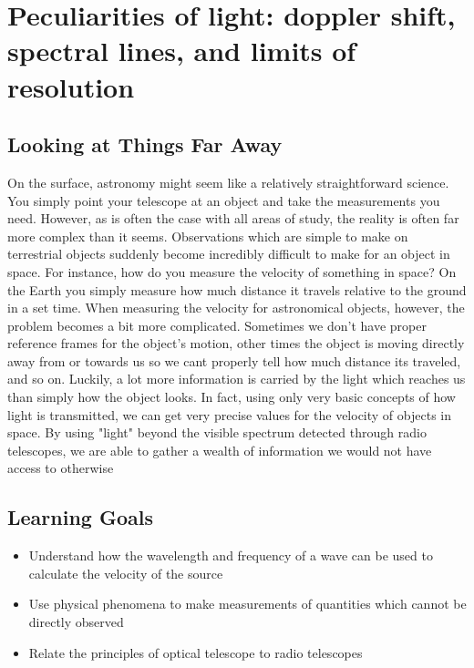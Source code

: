 \chapter{Peculiarities of light: doppler shift, spectral lines, and limits of resolution}

\section{Looking at Things Far Away}
On the surface, astronomy might seem like a relatively straightforward science. You simply point your telescope at an object and take the measurements you need. However, as is often the case with all areas of study, the reality is often far more complex than it seems. Observations which are simple to make on terrestrial objects suddenly become incredibly difficult to make for an object in space. For instance, how do you measure the velocity of something in space? On the Earth you simply measure how much distance it travels relative to the ground in a set time. When measuring the velocity for astronomical objects, however, the problem becomes a bit more complicated. Sometimes we don't have proper reference frames for the object's motion, other times the object is moving directly away from or towards us so we cant properly tell how much distance its traveled, and so on. Luckily, a lot more information is carried by the light which reaches us than simply how the object looks. In fact, using only very basic concepts of how light is transmitted, we can get very precise values for the velocity of objects in space. By using "light" beyond the visible spectrum detected through radio telescopes, we are able to gather a wealth of information we would not have access to otherwise 


\section{Learning Goals}
\begin{itemize}
	\item Understand how the wavelength and frequency of a wave can be used to calculate the velocity of the source
	
	\item Use physical phenomena to make measurements of quantities which cannot be directly observed
	
	\item Relate the principles of optical telescope to radio telescopes
\end{itemize}

